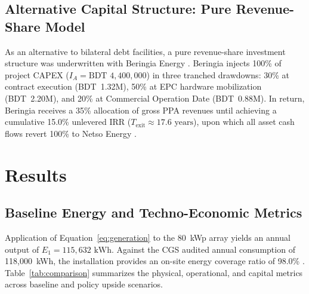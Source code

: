 \documentclass[11pt,a4paper]{article}
\begin{document}
\subsection{Alternative Capital Structure: Pure Revenue-Share Model}
As an alternative to bilateral debt facilities, a pure revenue-share investment structure was underwritten with Beringia Energy \cite{beringia_entity, rsa_doc}. Beringia injects 100\% of project CAPEX ($I_A = \text{BDT } 4,400,000$) in three tranched drawdowns: 30\% at contract execution (BDT~1.32M), 50\% at EPC hardware mobilization (BDT~2.20M), and 20\% at Commercial Operation Date (BDT~0.88M). In return, Beringia receives a 35\% allocation of gross PPA revenues until achieving a cumulative 15.0\% unlevered IRR ($T_{\text{exit}} \approx 17.6\text{ years}$), upon which all asset cash flows revert 100\% to Netso Energy \cite{rsa_doc}.

\section{Results}

\subsection{Baseline Energy and Techno-Economic Metrics}
Application of Equation~\eqref{eq:generation} to the 80~kWp array yields an annual output of $E_1 = 115,632\text{ kWh}$. Against the CGS audited annual consumption of 118,000~kWh, the installation provides an on-site energy coverage ratio of 98.0\% \cite{gt_constants}. Table~\ref{tab:comparison} summarizes the physical, operational, and capital metrics across baseline and policy upside scenarios.
\end{document}
